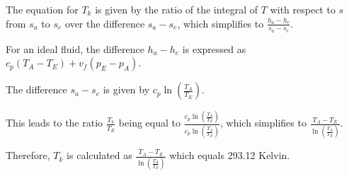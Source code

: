 The equation for \( T_k \) is given by the ratio of the integral of \( T \) with respect to \( s \) from \( s_a \) to \( s_e \) over the difference \( s_a - s_e \), which simplifies to \( \frac{h_a - h_e}{s_a - s_e} \).

For an ideal fluid, the difference \( h_a - h_e \) is expressed as \( c_p (T_A - T_E) + v_f (p_E - p_A) \).

The difference \( s_a - s_e \) is given by \( c_p \ln \left( \frac{T_A}{T_E} \right) \).

This leads to the ratio \( \frac{T_k}{T_E} \) being equal to \( \frac{c_p \ln \left( \frac{T_A}{T_E} \right)}{c_p \ln \left( \frac{T_A}{T_E} \right)} \), which simplifies to \( \frac{T_A - T_E}{\ln \left( \frac{T_A}{T_E} \right)} \).

Therefore, \( T_k \) is calculated as \( \frac{T_A - T_E}{\ln \left( \frac{T_A}{T_E} \right)} \) which equals 293.12 Kelvin.